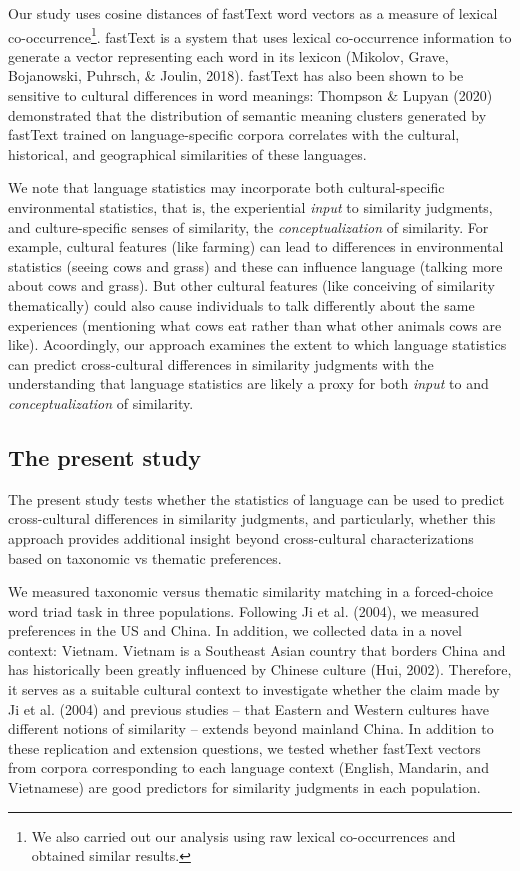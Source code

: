 \documentclass[10pt, letterpaper]{article}
\begin{document}
Our study uses cosine distances of fastText word vectors as a measure of
lexical co-occurrence\footnote{We also carried out our analysis using
  raw lexical co-occurrences and obtained similar results.}. fastText is
a system that uses lexical co-occurrence information to generate a
vector representing each word in its lexicon (Mikolov, Grave,
Bojanowski, Puhrsch, \& Joulin, 2018). fastText has also been shown to
be sensitive to cultural differences in word meanings: Thompson \&
Lupyan (2020) demonstrated that the distribution of semantic meaning
clusters generated by fastText trained on language-specific corpora
correlates with the cultural, historical, and geographical similarities
of these languages.

We note that language statistics may incorporate both cultural-specific
environmental statistics, that is, the experiential \emph{input} to
similarity judgments, and culture-specific senses of similarity, the
\emph{conceptualization} of similarity. For example, cultural features
(like farming) can lead to differences in environmental statistics
(seeing cows and grass) and these can influence language (talking more
about cows and grass). But other cultural features (like conceiving of
similarity thematically) could also cause individuals to talk
differently about the same experiences (mentioning what cows eat rather
than what other animals cows are like). Acoordingly, our approach
examines the extent to which language statistics can predict
cross-cultural differences in similarity judgments with the
understanding that language statistics are likely a proxy for both
\emph{input} to and \emph{conceptualization} of similarity.

\hypertarget{the-present-study}{%
\subsection{The present study}\label{the-present-study}}

The present study tests whether the statistics of language can be used
to predict cross-cultural differences in similarity judgments, and
particularly, whether this approach provides additional insight beyond
cross-cultural characterizations based on taxonomic vs thematic
preferences.

We measured taxonomic versus thematic similarity matching in a
forced-choice word triad task in three populations. Following Ji et al.
(2004), we measured preferences in the US and China. In addition, we
collected data in a novel context: Vietnam. Vietnam is a Southeast Asian
country that borders China and has historically been greatly influenced
by Chinese culture (Hui, 2002). Therefore, it serves as a suitable
cultural context to investigate whether the claim made by Ji et al.
(2004) and previous studies -- that Eastern and Western cultures have
different notions of similarity -- extends beyond mainland China. In
addition to these replication and extension questions, we tested whether
fastText vectors from corpora corresponding to each language context
(English, Mandarin, and Vietnamese) are good predictors for similarity
judgments in each population.
\end{document}
